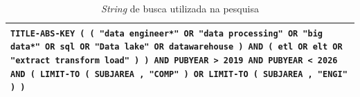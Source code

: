 \begin{table}[ht]
\centering
\caption{\textit{String} de busca utilizada na pesquisa}
\label{tab:string_busca}
\begin{tabular}{|p{15cm}|}
\hline
\texttt{TITLE-ABS-KEY ( ( "data engineer*" OR "data processing" OR "big data*" OR sql OR "Data lake" OR datawarehouse ) AND ( etl OR elt OR "extract transform load" ) ) AND PUBYEAR > 2019 AND PUBYEAR < 2026 AND ( LIMIT-TO ( SUBJAREA , "COMP" ) OR LIMIT-TO ( SUBJAREA , "ENGI" ) )} \\
\hline
\end{tabular}
\end{table}